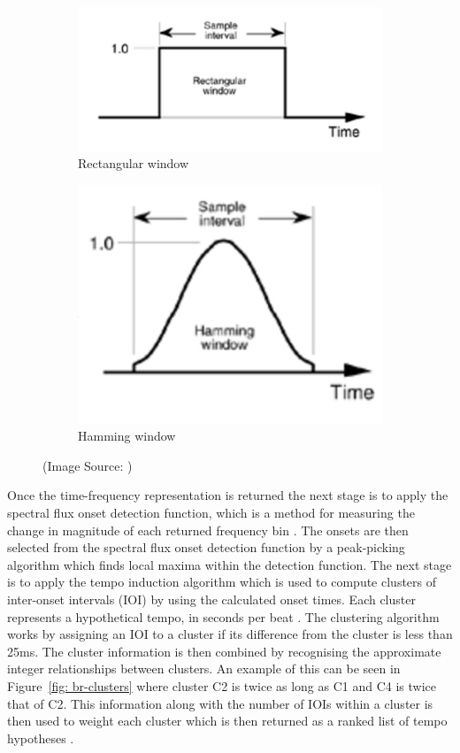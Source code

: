 \documentclass[a4paper, 11pt]{article}
\begin{document}
\begin{figure}[ht]
\centering
\begin{subfigure}{.5\textwidth}
  \centering
  \includegraphics[width=0.6\linewidth]{images/rectangWin.jpg}
  \caption{Rectangular window}
  \label{fig: rectan}
\end{subfigure}%
\begin{subfigure}{.5\textwidth}
  \centering
  \includegraphics[width=0.6\linewidth]{images/hamming.jpg}
  \caption{Hamming window}
  \label{fig: hamWin}
\end{subfigure}
\caption{(Image Source: \cite{lyons})}
\label{fig: Wins}
\end{figure}


Once the time-frequency representation is returned the next stage is to apply the spectral flux onset detection function, which is a method for measuring the change in magnitude of each returned frequency bin \cite{dixon2}. The onsets are then selected from the spectral flux onset detection function by a peak-picking algorithm which finds local maxima within the detection function. The next stage is to apply the tempo induction algorithm which is used to compute clusters of inter-onset intervals (IOI) by using the calculated onset times. Each cluster represents a hypothetical tempo, in seconds per beat \cite{dixon1}. The clustering algorithm works by assigning an IOI to a cluster if its difference from the cluster is less than 25ms. The cluster information is then combined by recognising the approximate integer relationships between clusters. An example of this can be seen in Figure~\ref{fig: br-clusters} where cluster C2 is twice as long as C1 and C4 is twice that of C2. This information along with the number of IOIs within a cluster is then used to weight each cluster which is then returned as a ranked list of tempo hypotheses \cite{dixon4}.
\end{document}
